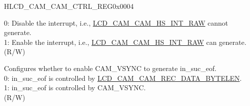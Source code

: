\begin{register}{H}{LCD\_CAM\_CAM\_CTRL\_REG}{0x0004}
\begin{regdesc}
\begin{reglist}
0: Disable the interrupt, i.e., \hyperref[fielddesc:LCDCAMCAMHSINTRAW]{LCD\_CAM\_CAM\_HS\_INT\_RAW} cannot generate. \\
1: Enable the interrupt, i.e., \hyperref[fielddesc:LCDCAMCAMHSINTRAW]{LCD\_CAM\_CAM\_HS\_INT\_RAW} can generate.\\
(R/W)
\label{fielddesc:LCDCAMCAMVSEOFEN}\item [LCD\_CAM\_CAM\_VS\_EOF\_EN] Configures whether to enable CAM\_VSYNC to generate in\_suc\_eof.\\
0: in\_suc\_eof is controlled by \hyperref[fielddesc:LCDCAMCAMRECDATABYTELEN]{LCD\_CAM\_CAM\_REC\_DATA\_BYTELEN}. \\
1: in\_suc\_eof is controlled by CAM\_VSYNC.\\
(R/W)
\end{reglist}\end{regdesc}
\end{register}


